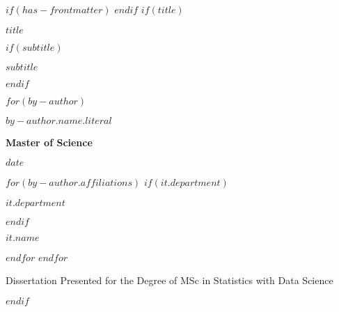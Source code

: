 $if(has-frontmatter)$
\frontmatter
$endif$
$if(title)$
\cleardoublepage
\thispagestyle{empty}
\vspace*{2cm}  %

\begin{center}
  {\huge\bfseries $title$ \par}
  $if(subtitle)$
  \vspace{1.5em}
  
  {\Large\bfseries $subtitle$ \par}
  $endif$
  
  \vspace{6em}

  $for(by-author)$
  {\Large\bfseries $by-author.name.literal$ \par}
  
  \vspace{2em}
  {\bfseries\large Master of Science \par}
  
  \vspace{1.5em}
  {\bfseries\large $date$ \par}
  
  \vspace{4em}

  $for(by-author.affiliations)$
  $if(it.department)$
  {\bfseries\large $it.department$ \par}
  $endif$
  
  {\bfseries\large $it.name$ \par}
  $endfor$
  $endfor$
  
  \vspace{6em}
  {\small Dissertation Presented for the Degree of MSc in Statistics with Data Science \par}
\end{center}
$endif$
